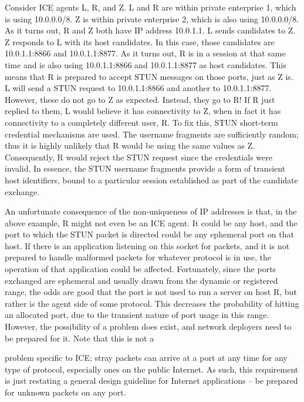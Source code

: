 \documentclass{article}
\begin{document}
Consider ICE agents L, R, and Z.  L and R are within private enterprise 1, which is using 10.0.0.0/8.  Z is within private enterprise 2, which is also using 10.0.0.0/8.  As it turns out, R and Z both have IP address 10.0.1.1.  L sends candidates to Z.  Z responds to L with its host candidates.  In this case, those candidates are 10.0.1.1:8866 and 10.0.1.1:8877.  As it turns out, R is in a session at that same time and is also using 10.0.1.1:8866 and 10.0.1.1:8877 as host candidates.  This means that R is prepared to accept STUN messages on those ports, just as Z is.  L will send a STUN request to 10.0.1.1:8866 and another to 10.0.1.1:8877.  However, these do not go to Z as expected.  Instead, they go to R!  If R just replied to them, L would believe it has connectivity to Z, when in fact it has connectivity to a completely different user, R.  To fix this, STUN short-term credential mechanisms are used.  The username fragments are sufficiently random; thus it is highly unlikely that R would be using the same values as Z.  Consequently, R would reject the STUN request since the credentials were invalid.  In essence, the STUN username fragments provide a form of transient host identifiers, bound to a particular session established as part of the candidate exchange.

An unfortunate consequence of the non-uniqueness of IP addresses is that, in the above example, R might not even be an ICE agent.  It could be any host, and the port to which the STUN packet is directed could be any ephemeral port on that host.  If there is an application listening on this socket for packets, and it is not prepared to handle malformed packets for whatever protocol is in use, the operation of that application could be affected.  Fortunately, since the ports exchanged are ephemeral and usually drawn from the dynamic or registered range, the odds are good that the port is not used to run a server on host R, but rather is the agent side of some protocol.  This decreases the probability of hitting an allocated port, due to the transient nature of port usage in this range. However, the possibility of a problem does exist, and network deployers need to be prepared for it.  Note that this is not a

problem specific to ICE; stray packets can arrive at a port at any time for any type of protocol, especially ones on the public Internet.  As such, this requirement is just restating a general design guideline for Internet applications -- be prepared for unknown packets on any port.
\end{document}
